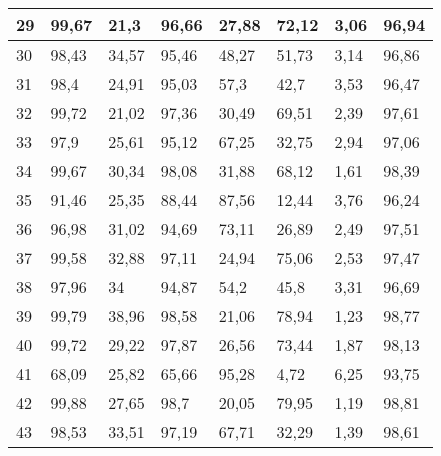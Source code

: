 \begin{longtable}[c]{|l|l|l|l|l|l|l|l|}
29              & 99,67        & 21,3         & 96,66       & 27,88         & 72,12         & 3,06          & 96,94         \\ \hline
30              & 98,43        & 34,57        & 95,46       & 48,27         & 51,73         & 3,14          & 96,86         \\ \hline
31              & 98,4         & 24,91        & 95,03       & 57,3          & 42,7          & 3,53          & 96,47         \\ \hline
32              & 99,72        & 21,02        & 97,36       & 30,49         & 69,51         & 2,39          & 97,61         \\ \hline
33              & 97,9         & 25,61        & 95,12       & 67,25         & 32,75         & 2,94          & 97,06         \\ \hline
34              & 99,67        & 30,34        & 98,08       & 31,88         & 68,12         & 1,61          & 98,39         \\ \hline
35              & 91,46        & 25,35        & 88,44       & 87,56         & 12,44         & 3,76          & 96,24         \\ \hline
36              & 96,98        & 31,02        & 94,69       & 73,11         & 26,89         & 2,49          & 97,51         \\ \hline
37              & 99,58        & 32,88        & 97,11       & 24,94         & 75,06         & 2,53          & 97,47         \\ \hline
38              & 97,96        & 34           & 94,87       & 54,2          & 45,8          & 3,31          & 96,69         \\ \hline
39              & 99,79        & 38,96        & 98,58       & 21,06         & 78,94         & 1,23          & 98,77         \\ \hline
40              & 99,72        & 29,22        & 97,87       & 26,56         & 73,44         & 1,87          & 98,13         \\ \hline
41              & 68,09        & 25,82        & 65,66       & 95,28         & 4,72          & 6,25          & 93,75         \\ \hline
42              & 99,88        & 27,65        & 98,7        & 20,05         & 79,95         & 1,19          & 98,81         \\ \hline
43              & 98,53        & 33,51        & 97,19       & 67,71         & 32,29         & 1,39          & 98,61         \\ \hline

\end{longtable}
